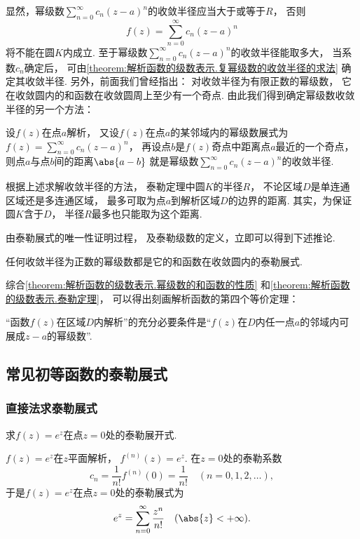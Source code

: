 显然，幂级数\(\sum_{n=0}^\infty c_n (z-a)^n\)的收敛半径应当大于或等于\(R\)，
否则\begin{equation*}
	f(z) = \sum_{n=0}^\infty c_n (z-a)^n
\end{equation*}将不能在圆\(K\)内成立.
至于幂级数\(\sum_{n=0}^\infty c_n (z-a)^n\)的收敛半径能取多大，
当系数\(c_n\)确定后，
可由\cref{theorem:解析函数的级数表示.复幂级数的收敛半径的求法} 确定其收敛半径.
另外，前面我们曾经指出：
对收敛半径为有限正数的幂级数，
它在收敛圆内的和函数在收敛圆周上至少有一个奇点.
由此我们得到确定幂级数收敛半径的另一个方法：

设\(f(z)\)在点\(a\)解析，
又设\(f(z)\)在点\(a\)的某邻域内的幂级数展式为
\(f(z) = \sum_{n=0}^\infty c_n (z-a)^n\)，
再设点\(b\)是\(f(z)\)奇点中距离点\(a\)最近的一个奇点，
则点\(a\)与点\(b\)间的距离\(\abs{a-b}\)
就是幂级数\(\sum_{n=0}^\infty c_n (z-a)^n\)的收敛半径.

根据上述求解收敛半径的方法，
泰勒定理中圆\(K\)的半径\(R\)，
不论区域\(D\)是单连通区域还是多连通区域，
最多可取为点\(a\)到解析区域\(D\)的边界的距离.
其实，为保证圆\(K\)含于\(D\)，
半径\(R\)最多也只能取为这个距离.

由泰勒展式的唯一性证明过程，
及泰勒级数的定义，立即可以得到下述推论.
\begin{corollary}
任何收敛半径为正数的幂级数都是它的和函数在收敛圆内的泰勒展式.
\end{corollary}

综合\cref{theorem:解析函数的级数表示.幂级数的和函数的性质}
和\cref{theorem:解析函数的级数表示.泰勒定理}，
可以得出刻画解析函数的第四个等价定理：
\begin{theorem}
“函数\(f(z)\)在区域\(D\)内解析”的充分必要条件是“\(f(z)\)在\(D\)内任一点\(a\)的邻域内可展成\(z-a\)的幂级数”.
\end{theorem}

\subsection{常见初等函数的泰勒展式}
\subsubsection{直接法求泰勒展式}
\begin{example}
求\(f(z) = e^z\)在点\(z = 0\)处的泰勒展开式.
\begin{solution}
\(f(z) = e^z\)在\(z\)平面解析，
\(f^{(n)}(z) = e^z\).
在\(z = 0\)处的泰勒系数\begin{equation*}
	c_n = \frac1{n!} f^{(n)}(0) = \frac1{n!}
	\quad(n=0,1,2,\dotsc),
\end{equation*}
于是\(f(z) = e^z\)在点\(z = 0\)处的泰勒展式为
\begin{equation}\label{equation:解析函数的级数表示.指数函数的泰勒展式}
	e^z = \sum_{n=0}^\infty \frac{z^n}{n!}
	\quad(\abs{z} < +\infty).
\end{equation}
\end{solution}
\end{example}


